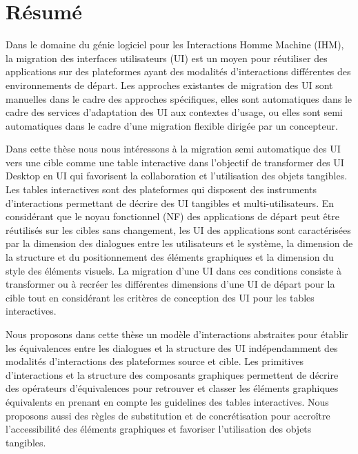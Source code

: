 
\section*{R\'{e}sum\'{e}}
Dans le domaine du g\'{e}nie logiciel pour les Interactions Homme Machine (IHM), la migration des interfaces utilisateurs (UI) est un moyen pour r\'{e}utiliser des applications sur des plateformes ayant des modalit\'{e}s d'interactions diff\'{e}rentes des environnements de d\'{e}part. Les approches existantes de migration des UI sont manuelles dans le cadre des approches sp\'{e}cifiques, elles sont automatiques dans le cadre des services d'adaptation des UI aux contextes d'usage, ou elles sont semi automatiques dans le cadre d'une migration flexible dirig\'{e}e par un concepteur.

Dans cette thèse nous nous int\'{e}ressons à la migration semi automatique des UI vers une cible comme une table interactive dans l'objectif de transformer des UI Desktop en UI qui favorisent la collaboration et l'utilisation des objets tangibles. Les tables interactives sont des plateformes qui disposent des instruments d'interactions permettant de d\'{e}crire des UI tangibles et multi-utilisateurs. En consid\'{e}rant que le noyau fonctionnel (NF) des applications de d\'{e}part peut être r\'{e}utilis\'{e}s sur les cibles sans changement, les UI des applications sont caract\'{e}ris\'{e}es par la dimension des dialogues entre les utilisateurs et le système, la dimension de la structure et
du positionnement des \'{e}l\'{e}ments graphiques et la dimension du style des \'{e}l\'{e}ments visuels. La migration d'une UI dans ces conditions consiste à transformer ou à recr\'{e}er les diff\'{e}rentes dimensions d'une UI de d\'{e}part pour la cible tout en consid\'{e}rant les critères de conception des UI pour les tables interactives.

Nous proposons dans cette thèse un modèle d'interactions abstraites pour \'{e}tablir les \'{e}quivalences entre les dialogues et la structure des UI ind\'{e}pendamment des modalit\'{e}s d'interactions des plateformes source et cible. Les primitives d'interactions et la structure des composants graphiques permettent de d\'{e}crire des op\'{e}rateurs d'\'{e}quivalences pour retrouver et classer les \'{e}l\'{e}ments graphiques \'{e}quivalents en prenant en compte les guidelines des tables interactives. Nous proposons aussi des règles de substitution et de concr\'{e}tisation pour accroître l'accessibilit\'{e} des \'{e}l\'{e}ments graphiques et favoriser l'utilisation des objets tangibles.

